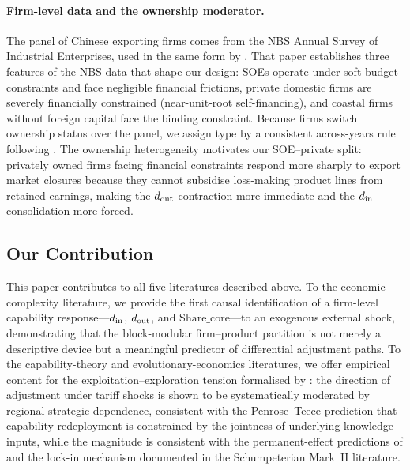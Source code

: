 \paragraph{Firm-level data and the ownership moderator.}
The panel of Chinese exporting firms comes from the NBS Annual Survey of Industrial
Enterprises, used in the same form by \citet{guariglia2011}. That paper establishes
three features of the NBS data that shape our design: SOEs operate under soft budget
constraints and face negligible financial frictions, private domestic firms are
severely financially constrained (near-unit-root self-financing), and coastal firms
without foreign capital face the binding constraint. Because firms switch ownership
status over the panel, we assign type by a consistent across-years rule following
\citet{guariglia2011}. The ownership heterogeneity motivates our SOE--private split:
privately owned firms facing financial constraints respond more sharply to export market
closures because they cannot subsidise loss-making product lines from retained earnings,
making the $d_{\rm out}$ contraction more immediate and the $d_{\rm in}$ consolidation
more forced.

\subsection{Our Contribution}
\label{subsec:contribution}

This paper contributes to all five literatures described above. To the economic-complexity
literature, we provide the first causal identification of a firm-level capability
response---$d_{\rm in}$, $d_{\rm out}$, and $\text{Share\_core}$---to an exogenous external shock,
demonstrating that the block-modular firm--product partition is not merely a descriptive
device but a meaningful predictor of differential adjustment paths. To the capability-theory
and evolutionary-economics literatures, we offer empirical content for the
exploitation--exploration tension formalised by \citet{march1991}: the direction of
adjustment under tariff shocks is shown to be systematically moderated by regional
strategic dependence, consistent with the Penrose--Teece prediction that capability
redeployment is constrained by the jointness of underlying knowledge inputs, while the
magnitude is consistent with the permanent-effect predictions of \citet{storper1992}
and the lock-in mechanism documented in the Schumpeterian Mark~II literature.

